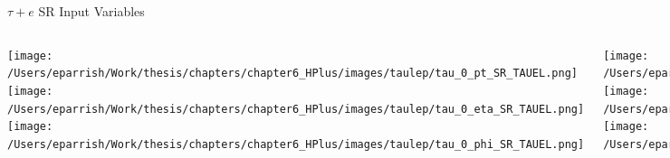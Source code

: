\documentclass[aspectratio=169,xcolor=table]{beamer}
\begin{document}
    \begin{frame}[t]{$\tau+e$ SR Input Variables}
      \begin{columns}[t]
          \texttt{[image: /Users/eparrish/Work/thesis/chapters/chapter6\_HPlus/images/taulep/tau\_0\_pt\_SR\_TAUEL.png]}
          \texttt{[image: /Users/eparrish/Work/thesis/chapters/chapter6\_HPlus/images/taulep/tau\_0\_eta\_SR\_TAUEL.png]}
          \texttt{[image: /Users/eparrish/Work/thesis/chapters/chapter6\_HPlus/images/taulep/tau\_0\_phi\_SR\_TAUEL.png]}

          \texttt{[image: /Users/eparrish/Work/thesis/chapters/chapter6\_HPlus/images/taulep/met\_et\_SR\_TAUEL.png]}
          \texttt{[image: /Users/eparrish/Work/thesis/chapters/chapter6\_HPlus/images/taulep/met\_phi\_SR\_TAUEL.png]}
          \texttt{[image: /Users/eparrish/Work/thesis/chapters/chapter6\_HPlus/images/taulep/jet\_1\_pt\_SR\_TAUEL.png]}

          \texttt{[image: /Users/eparrish/Work/thesis/chapters/chapter6\_HPlus/images/taulep/bjet\_0\_pt\_SR\_TAUEL.png]}
          \texttt{[image: /Users/eparrish/Work/thesis/chapters/chapter6\_HPlus/images/taulep/bjet\_0\_eta\_SR\_TAUEL.png]}
          \texttt{[image: /Users/eparrish/Work/thesis/chapters/chapter6\_HPlus/images/taulep/bjet\_0\_phi\_SR\_TAUEL.png]}

          \texttt{[image: /Users/eparrish/Work/thesis/chapters/chapter6\_HPlus/images/taulep/tau\_0\_upsilon\_SR\_TAUEL.png]}
          \texttt{[image: /Users/eparrish/Work/thesis/chapters/chapter6\_HPlus/images/taulep/tau\_0\_charged\_tracks\_0\_pt\_SR\_TAUEL.png]}

      \end{columns}
    \end{frame}
\end{document}
